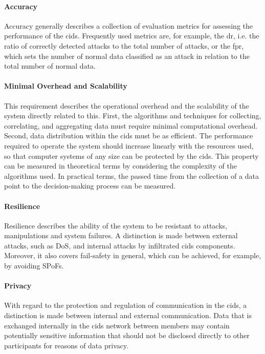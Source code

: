 \paragraph{Accuracy} Accuracy generally describes a collection of evaluation metrics for assessing the performance of the \gls{cids}. Frequently used metrics are, for example, the \gls{dr}, i.e. the ratio of correctly detected attacks to the total number of attacks, or the \gls{fpr}, which sets the number of normal data classified as an attack in relation to the total number of normal data. 

\paragraph{Minimal Overhead and Scalability} This requirement describes the operational overhead and the scalability of the system directly related to this. First, the algorithms and techniques for collecting, correlating, and aggregating data must require minimal computational overhead. Second, data distribution within the \acrshort{cids} must be as efficient. The performance required to operate the system should increase linearly with the resources used, so that computer systems of any size can be protected by the \gls{cids}. This property can be measured in theoretical terms by considering the complexity of the algorithms used. In practical terms, the passed time from the collection of a data point to the decision-making process can be measured.

\paragraph{Resilience} Resilience describes the ability of the system to be resistant to attacks, manipulations and system failures. A distinction is made between external attacks, such as DoS, and internal attacks by infiltrated \gls{cids} components. Moreover, it also covers fail-safety in general, which can be achieved, for example, by avoiding SPoFs.

\paragraph{Privacy} With regard to the protection and regulation of communication in the \gls{cids}, a distinction is made between internal and external communication. Data that is exchanged internally in the \gls{cids} network between members may contain potentially sensitive information that should not be disclosed directly to other participants for reasons of data privacy. 

